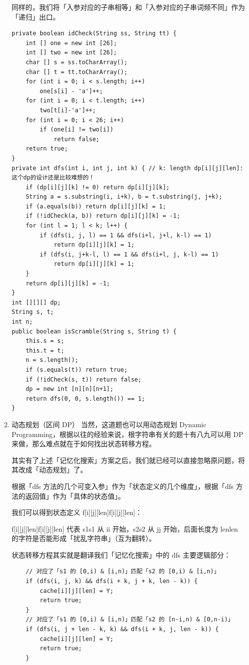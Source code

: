 \documentclass[9pt, b5paaper]{book}
\begin{document}
\begin{enumerate}
同样的，我们将「入参对应的子串相等」和「入参对应的子串词频不同」作为「递归」出口。
\begin{verbatim}
private boolean idCheck(String ss, String tt) {
    int [] one = new int [26];
    int [] two = new int [26];
    char [] s = ss.toCharArray();
    char [] t = tt.toCharArray();
    for (int i = 0; i < s.length; i++) 
        one[s[i] - 'a']++;
    for (int i = 0; i < t.length; i++) 
        two[t[i]-'a']++;
    for (int i = 0; i < 26; i++) 
        if (one[i] != two[i])
            return false;
    return true;
}
private int dfs(int i, int j, int k) { // k: length dp[i][j][len]: 这个dp的设计还是比较难想的！
    if (dp[i][j][k] != 0) return dp[i][j][k];
    String a = s.substring(i, i+k), b = t.substring(j, j+k);
    if (a.equals(b)) return dp[i][j][k] = 1;
    if (!idCheck(a, b)) return dp[i][j][k] = -1;
    for (int l = 1; l < k; l++) {
        if (dfs(i, j, l) == 1 && dfs(i+l, j+l, k-l) == 1)
            return dp[i][j][k] = 1;
        if (dfs(i, j+k-l, l) == 1 && dfs(i+l, j, k-l) == 1)
            return dp[i][j][k] = 1;
    }
    return dp[i][j][k] = -1;
}
int [][][] dp;
String s, t;
int n;
public boolean isScramble(String s, String t) {
    this.s = s;
    this.t = t;
    n = s.length();
    if (s.equals(t)) return true;
    if (!idCheck(s, t)) return false;
    dp = new int [n][n][n+1];
    return dfs(0, 0, s.length()) == 1;
}
\end{verbatim}
\item 动态规划（区间 DP）
\label{sec-1-0-2-3}
当然，这道题也可以用动态规划 Dynamic Programming，根据以往的经验来说，根字符串有关的题十有八九可以用 DP 来做，那么难点就在于如何找出状态转移方程。

其实有了上述「记忆化搜索」方案之后，我们就已经可以直接忽略原问题，将其改成「动态规划」了。

根据「dfs 方法的几个可变入参」作为「状态定义的几个维度」，根据「dfs 方法的返回值」作为「具体的状态值」。

我们可以得到状态定义 f[i][j][len]f[i][j][len]：

f[i][j][len]f[i][j][len] 代表 s1s1 从 ii 开始，s2s2 从 jj 开始，后面长度为 lenlen 的字符是否能形成「扰乱字符串」（互为翻转）。

状态转移方程其实就是翻译我们「记忆化搜索」中的 dfs 主要逻辑部分：

\begin{verbatim}
    // 对应了「s1 的 [0,i) & [i,n)」匹配「s2 的 [0,i) & [i,n)」
    if (dfs(i, j, k) && dfs(i + k, j + k, len - k)) {
        cache[i][j][len] = Y;
        return true;
    }
    // 对应了「s1 的 [0,i) & [i,n)」匹配「s2 的 [n-i,n) & [0,n-i)」
    if (dfs(i, j + len - k, k) && dfs(i + k, j, len - k)) {
        cache[i][j][len] = Y;
        return true;
    }
\end{verbatim}


\end{enumerate}
\end{document}
